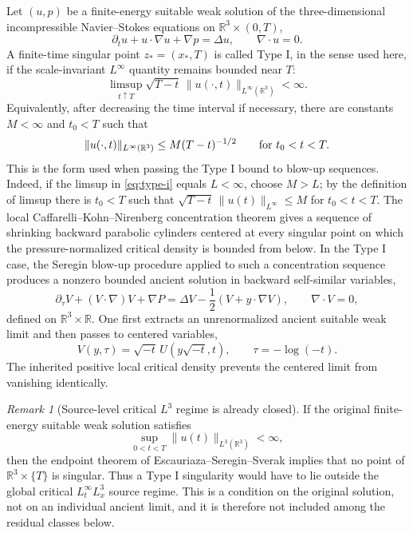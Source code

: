 \documentclass[11pt]{amsart}
\theoremstyle{plain}
\theoremstyle{definition}
\theoremstyle{remark}
\newtheorem{remark}[theorem]{Remark}
\numberwithin{equation}{section}
\begin{document}
Let \((u,p)\) be a finite-energy suitable weak solution of the
three-dimensional incompressible Navier--Stokes equations on
\(\mathbb R^3\times(0,T)\),
\begin{equation}\label{eq:ns}
   \partial_tu+u\cdot\nabla u+\nabla p=\Delta u,\qquad
   \nabla\cdot u=0 .
\end{equation}
A finite-time singular point \(z_*=(x_*,T)\) is called Type I, in the sense
used here, if the scale-invariant \(L^\infty\) quantity remains bounded near
\(T\):
\begin{equation}\label{eq:type-i}
   \limsup_{t\uparrow T}\sqrt{T-t}\,
   \|u(\cdot,t)\|_{L^\infty(\mathbb R^3)}<\infty .
\end{equation}
Equivalently, after decreasing the time interval if necessary, there are
constants \(M<\infty\) and \(t_0<T\) such that
\[
   \|u(\cdot,t)\|_{L^\infty(\mathbb R^3)}
   \le M(T-t)^{-1/2}
   \qquad\hbox{for }t_0<t<T.
\]
This is the form used when passing the Type I bound to blow-up sequences.
Indeed, if the limsup in \eqref{eq:type-i} equals \(L<\infty\), choose
\(M>L\); by the definition of limsup there is \(t_0<T\) such that
\(\sqrt{T-t}\,\|u(t)\|_{L^\infty}\le M\) for \(t_0<t<T\).
The local Caffarelli--Kohn--Nirenberg concentration theorem gives a sequence
of shrinking backward parabolic cylinders centered at every singular point on
which the pressure-normalized critical density is bounded from below.  In the
Type I case, the Seregin blow-up procedure applied to such a concentration
sequence produces a nonzero bounded ancient solution in backward
self-similar variables,
\begin{equation}\label{eq:centered}
   \partial_\tau V+(V\cdot\nabla)V+\nabla P
   =
   \Delta V-\frac12(V+y\cdot\nabla V),
   \qquad \nabla\cdot V=0,
\end{equation}
defined on \(\mathbb R^3\times\mathbb R\).  One first extracts an
unrenormalized ancient suitable weak limit and then passes to centered
variables,
\[
   V(y,\tau)=\sqrt{-t}\,U(y\sqrt{-t},t),\qquad \tau=-\log(-t).
\]
The inherited positive local critical density prevents the centered limit from
vanishing identically.

\begin{remark}[Source-level critical \(L^3\) regime is already closed]
\label{rem:source-L3-closed}
If the original finite-energy suitable weak solution satisfies
\[
   \sup_{0<t<T}\|u(t)\|_{L^3(\mathbb R^3)}<\infty ,
\]
then the endpoint theorem of Escauriaza--Seregin--Sverak \cite{ESS2003}
implies that no point of \(\mathbb R^3\times\{T\}\) is singular.  Thus a
Type I singularity would have to lie outside the global critical
\(L^\infty_tL^3_x\) source regime.  This is a condition on the original
solution, not on an individual ancient limit, and it is therefore not included
among the residual classes below.
\end{remark}
\end{document}

